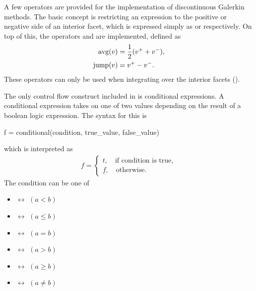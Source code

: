 A few operators are provided for the implementation of discontinuous
Galerkin methods.  The basic concept is restricting an expression to
the positive or negative side of an interior facet, which is expressed
simply as  or  respectively. On top of
this, the operators  and  are implemented,
defined as
\begin{align}
\operatorname{avg}(v)  &= \frac 1 2 (v^+ + v^-), \\
\operatorname{jump}(v) &= v^+ - v^- .
\end{align}
These operators can only be used when integrating over the interior facets
().

The only control flow construct included in \ufl{} is conditional
expressions. A conditional expression takes on one of two values depending
on the result of a boolean logic expression. The syntax for this is
\begin{python}
f = conditional(condition, true_value, false_value)
\end{python}
which is interpreted as
\begin{align}
f = \begin{cases}
    t, \quad \mbox{if condition is true}, \\
    f, \quad \mbox{otherwise}.
    \end{cases}
\end{align}
The condition can be one of
\begin{multicols}{2}
\begin{itemize}
\item {} $\leftrightarrow$ $(a < b)$
\item {} $\leftrightarrow$ $(a \le b)$
\item {} $\leftrightarrow$ $(a = b)$
\end{itemize}
\begin{itemize}
\item {} $\leftrightarrow$ $(a > b)$
\item {} $\leftrightarrow$ $(a \ge b)$
\item {} $\leftrightarrow$ $(a \ne b)$
\end{itemize}
\end{multicols}


